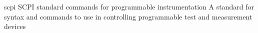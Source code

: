 \newglsXacronym%
{scpi}%
{SCPI}%
{standard commands for programmable instrumentation}%
{A standard for syntax and commands to use in controlling programmable test and measurement devices}%